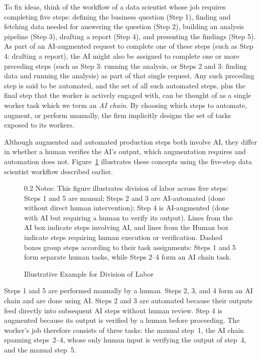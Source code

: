 To fix ideas, think of the workflow of a data scientist whose job requires completing five steps: defining the business question (Step 1), finding and fetching data needed for answering the question (Step 2), building an analysis pipeline (Step 3), drafting a report (Step 4), and presenting the findings (Step 5).
As part of an AI-augmented request to complete one of these steps (such as Step 4: drafting a report), the AI might also be assigned to complete one or more preceding steps (such as Step 3: running the analysis, or Steps 2 and 3: finding data and running the analysis) as part of that single request.
Any such preceding step is said to be automated, and the set of all such automated steps, plus the final step that the worker is actively engaged with, can be thought of as a single worker task which we term an \emph{AI chain}.
By choosing which steps to automate, augment, or perform manually, the firm implicitly designs the set of tasks exposed to its workers.

Although augmented and automated production steps both involve AI, they differ in whether a human verifies the AI's output, which augmentation requires and automation does not.
Figure~\ref{fig:task_division} illustrates these concepts using the five-step data scientist workflow described earlier.
\begin{figure}[!t]
  \centering
  \caption{Illustrative Example for Division of Labor}
  \label{fig:task_division}
  
  \par\vspace{\fignotesskip}
\begin{minipage}{1\linewidth}
\begin{spacing}{0.2}
{\fontsize{9.5pt}{10pt}\selectfont Notes: This figure illustrates division of labor across five steps: Steps 1 and 5 are manual; Steps 2 and 3 are AI-automated (done without direct human intervention); Step 4 is AI-augmented (done with AI but requiring a human to verify its output).
Lines from the AI box indicate steps involving AI, and lines from the Human box indicate steps requiring human execution or verification.
Dashed boxes group steps according to their task assignments: Steps 1 and 5 form separate human tasks, while Steps 2–4 form an AI chain task.}
\end{spacing}
\end{minipage}
\end{figure}
Steps 1 and 5 are performed manually by a human.
Steps 2, 3, and 4 form an AI chain and are done using AI.
Steps 2 and 3 are automated because their outputs feed directly into subsequent AI steps without human review.
Step 4 is augmented because its output is verified by a human before proceeding.
The worker's job therefore consists of three tasks: the manual step~1, the AI chain spanning steps~2--4, whose only human input is verifying the output of step~4, and the manual step~5.

